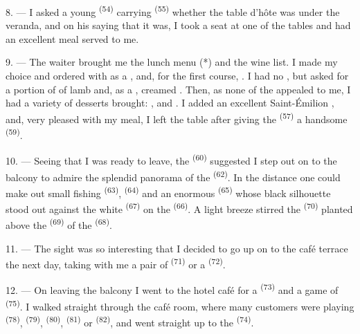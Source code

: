 8. --- I asked a young  \textsuperscript{(54)} carrying
 \textsuperscript{(55)} whether the table d'hôte was under the
veranda, and on his saying that it was, I took a seat at one of the
tables and had an excellent meal served to me.


\VUsaut{4.0mm}
\VUsaut{3.0mm}

9. --- The waiter brought me the lunch menu (*) and the wine list. I made
my choice and ordered  with  as a
, and, for the first course, . I had
no , but asked for a portion of  of lamb and, as a
, creamed . Then, as none of the
 appealed to me, I had a variety of desserts brought:
,  and . I added an excellent
Saint-Émilion , and, very pleased with my meal, I left the
table after giving the  \textsuperscript{(57)} a handsome 
\textsuperscript{(59)}.

10. --- Seeing that I was ready to leave, the  \textsuperscript{(60)}
suggested I step out on to the balcony to admire the splendid panorama of
the  \textsuperscript{(62)}. In the distance one could make out small
fishing  \textsuperscript{(63)},  \textsuperscript{(64)} and an
enormous  \textsuperscript{(65)} whose black silhouette stood out against
the white  \textsuperscript{(67)} on the  \textsuperscript{(66)}. A
light breeze stirred the  \textsuperscript{(70)} planted above the
 \textsuperscript{(69)} of the  \textsuperscript{(68)}.

\VUsaut{3.0mm}
\VUsaut{3.0mm}

11. --- The sight was so interesting that I decided to go up on to the
café terrace the next day, taking with me a pair of 
\textsuperscript{(71)} or a  \textsuperscript{(72)}.

12. --- On leaving the balcony I went to the hotel café for a
 \textsuperscript{(73)} and a game of  \textsuperscript{(75)}. I
walked straight through the café room, where many customers were playing
 \textsuperscript{(78)},  \textsuperscript{(79)},
 \textsuperscript{(80)},  \textsuperscript{(81)} or
 \textsuperscript{(82)}, and went straight up to the
 \textsuperscript{(74)}.

